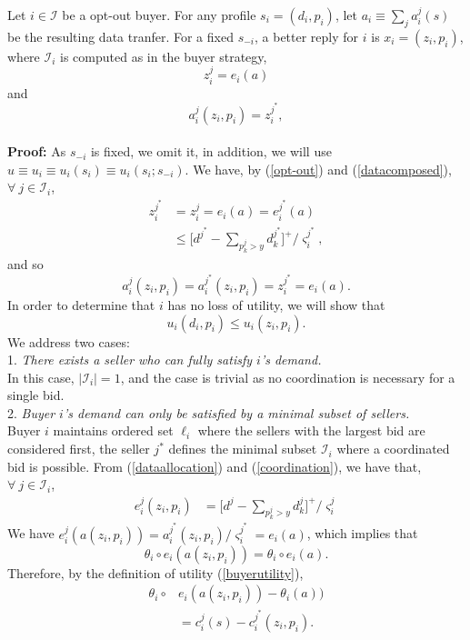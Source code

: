 \documentclass[12pt]{article}
\theoremstyle{definition}
\newcommand{\vs}{\varsigma}
\newcommand{\mcI}{\mathcal{I}}
\begin{document}
\begin{multicols}{2}
{
\label{coordinationlemma} 
Let $i\in\mcI$ be a opt-out buyer.
For any profile $s_i = (d_i, p_i)$, let $a_i \equiv \sum_j a_i^j(s)$ be the resulting data
tranfer. For a fixed $s_{-i}$, a better reply for $i$ is $x_i =
(z_i,p_i)$, where $\mcI_i$ is computed as in the buyer strategy,
$$
    z_i^j = e_i(a)
$$
and
\begin{equation}\label{coordination}
    a_i^j(z_i,p_i) = z_i^{j^*},
\end{equation}
}\\
\textbf{Proof:}
As $s_{-i}$ is fixed, we omit it, in addition, we will use $u\equiv u_i \equiv u_i(s_i) \equiv
u_i(s_i;s_{-i})$. 
We have, by (\ref{opt-out}) and (\ref{datacomposed}), $\forall \ j\in\mcI_i$,
\begin{align*}
    z_i^{j^*} &= z_i^j = e_i(a) = e_i^{j^*}(a) \\
    &\le \bigg\lbrack d^{j^*} - \sum_{p_k^j> y}
d_k^{j^*}\bigg\rbrack^+/\vs_i^{j^*},
\end{align*}
and so
$$
     a_i^j(z_i,p_i) = a_i^{j^*}(z_i,p_i) = z_i^{j^*}= e_i(a).
$$
In order to determine that $i$ has no loss of utility, we will show that
$$
    u_i(d_i,p_i) \le u_i(z_i,p_i).
$$
We address two cases:\\
1. \emph{There exists a seller who can fully satisfy $i$'s demand.} \\
In this case, $\vert\mcI_i\vert = 1$, and the case is trivial as no
coordination is necessary for a single bid.\\
2. \emph{Buyer $i$'s demand can only be satisfied by a minimal subset of sellers.} \\
Buyer $i$ maintains ordered set $\ell_i$ where the sellers with the
largest bid are considered first, the seller $j^*$ defines the minimal subset $\mcI_i$ where a
coordinated bid is possible. 
From (\ref{dataallocation}) and (\ref{coordination}), we have that, $\forall \ j\in \mcI_i$,
\begin{align*}
    e_i^j(z_i,p_i) &= \bigg\lbrack d^j - \sum_{p_k^j> y}
d_k^j\bigg\rbrack^+/\vs_i^j 
\end{align*}
We have $e_i^j(a(z_i,p_i)) = a_i^{j^*}(z_i,p_i)/\vs_i^{j^*} = e_i(a)$, which
implies that 
$$
\theta_i\circ e_i(a(z_i,p_i)) = \theta_i\circ e_i(a).
$$ 
Therefore, by the definition of utility (\ref{buyerutility}),
\begin{align*}
    \theta_i\circ& e_i(a(z_i,p_i)) - \theta_i(a)) \\
    &=  c_i^j(s) -c_i^{j^*}(z_i,p_i).
\end{align*}

\end{multicols}
\end{document}
